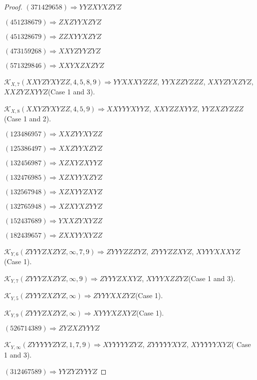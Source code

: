 \documentclass[12pt]{article}
\theoremstyle{plain}
\theoremstyle{definition}
\theoremstyle{remark}
\newcommand{\fancy}[1]{\mathcal{#1}}
\def\K{\fancy{K}}
\begin{document}
\begin{proof}
	$(3 7 1 4 2 9 6 5 8)\Rightarrow YYZXYXZYZ$
	
	$(4 5 1 2 3 8 6 7 9)\Rightarrow ZXZYYXZYZ$
	
	$(4 5 1 3 2 8 6 7 9)\Rightarrow ZZXYYXZYZ$
	
	$(4 7 3 1 5 9 2 6 8)\Rightarrow XXYZYYZYZ$
	
	$(5 7 1 3 2 9 8 4 6)\Rightarrow XXYXZXZYZ$
	
	
	
	$\K_{X,7}(XXYZYXYZZ,4, 5, 8, 9)\Rightarrow $$YYXXXYZZZ$, $YYXZZYZZZ$, $XXYZYXZYZ$, $XXZYZXYYZ$(Case 1 and 3).
	
	$\K_{X,8}(XXYZYXYZZ,4, 5, 9)\Rightarrow $$XXYYYXYYZ$, $XXYZZXYYZ$, $YYZXZYZZZ$(Case 1 and 2).
	
	
	
	$(1 2 3 4 8 6 9 5 7)\Rightarrow XXZYYXYZZ$
	
	$(1 2 5 3 8 6 4 9 7)\Rightarrow XXZYYXZYZ$
	
	$(1 3 2 4 5 6 9 8 7)\Rightarrow XZXYZXYYZ$
	
	$(1 3 2 4 7 6 9 8 5)\Rightarrow XZXYYXZYZ$
	
	$(1 3 2 5 6 7 9 4 8)\Rightarrow XZXYYZXYZ$
	
	$(1 3 2 7 6 5 9 4 8)\Rightarrow XZXYXZYYZ$
	
	$(1 5 2 4 3 7 6 8 9)\Rightarrow YXXZYXYZZ$
	
	$(1 8 2 4 3 9 6 5 7)\Rightarrow ZXXYYXYZZ$
	
	
	
	$\K_{Y,6}(ZYYYZXZYZ,\infty,7, 9)\Rightarrow $$ZYYYZZZYZ$, $ZYYYZZXYZ$, $XYYYXXXYZ$(Case 1).
	
	$\K_{Y,7}(ZYYYZXZYZ,\infty,9)\Rightarrow $$ZYYYZXXYZ$, $XYYYXZZYZ$(Case 1 and 3).
	
	$\K_{Y,5}(ZYYYZXZYZ,\infty)\Rightarrow $$ZYYYXXZYZ$(Case 1).
	
	$\K_{Y,9}(ZYYYZXZYZ,\infty)\Rightarrow $$XYYYXZXYZ$(Case 1).
	
	
	
	$(5 2 6 7 1 4 3 8 9)\Rightarrow ZYZXZYYYZ$
	
	
	
	$\K_{Y,\infty}(ZYYYYYZYZ,1, 7, 9)\Rightarrow $$XYYYYYZYZ$, $ZYYYYYXYZ$, $XYYYYYXYZ$( Case 1 and 3).
	
	
	
	$(3 1 2 4 6 7 5 8 9)\Rightarrow YYZYZYYYZ$
	
	
	
	
\end{proof}
\end{document}
